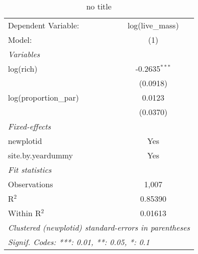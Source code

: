 
\begin{table}[htbp]
   \caption{no title}
   \centering
   \begin{tabular}{lc}
      \tabularnewline \midrule \midrule
      Dependent Variable:   & log(live\_mass)\\   
      Model:                & (1)\\  
      \midrule
      \emph{Variables}\\
      log(rich)             & -0.2635$^{***}$\\   
                            & (0.0918)\\   
      log(proportion\_par)  & 0.0123\\   
                            & (0.0370)\\   
      \midrule
      \emph{Fixed-effects}\\
      newplotid             & Yes\\  
      site.by.yeardummy     & Yes\\  
      \midrule
      \emph{Fit statistics}\\
      Observations          & 1,007\\  
      R$^2$                 & 0.85390\\  
      Within R$^2$          & 0.01613\\  
      \midrule \midrule
      \multicolumn{2}{l}{\emph{Clustered (newplotid) standard-errors in parentheses}}\\
      \multicolumn{2}{l}{\emph{Signif. Codes: ***: 0.01, **: 0.05, *: 0.1}}\\
   \end{tabular}
\end{table}


